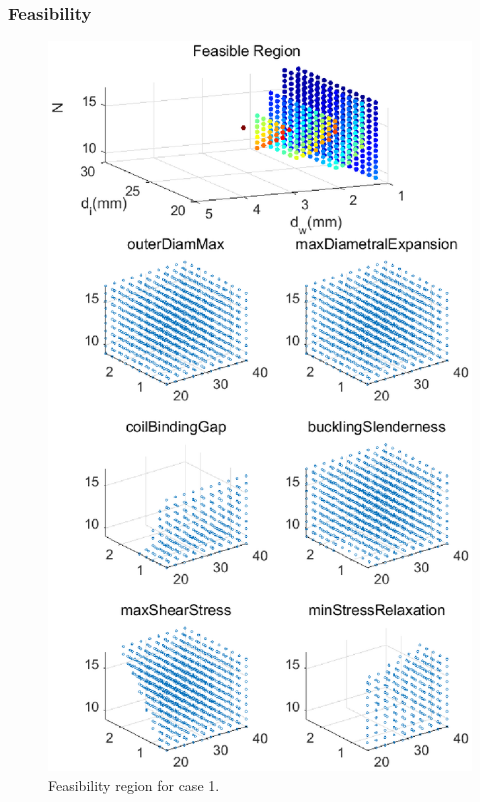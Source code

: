 \documentclass[10pt]{article}
\begin{document}
\newpage
\subsubsection{Feasibility}
	
			\begin{figure}[H]
		 \begin{center}\includegraphics[scale=.5]{Case_56_34891011new.eps}\end{center}
		 \caption{Feasibility region for case 1.}
		 \label{Feasibility region for case 1.}
		 \end{figure}
		 
\end{document}
